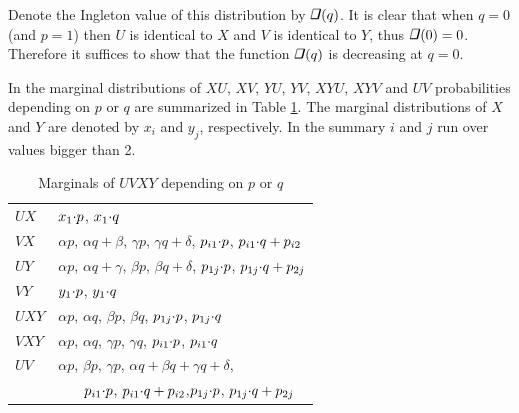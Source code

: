 \documentclass{IEEEtran}
\newcommand\ing{\begin{tikzpicture}[scale=0.13\ht\strutbox]%
        \draw[line width=0.015cm](0,0)--(0.055,0.22)--(0.22,0.22);
        \draw[line width=0.035cm](0.22,0.22)--(0.165,0);
        \draw[line width=0.025cm](0.165,0)--(0,0);
   \end{tikzpicture}}
\begin{document}
Denote the Ingleton value of this distribution by $\ing(q)$. It is clear
that when $q=0$ (and $p=1$) then $U$ is identical to $X$ and $V$ is
identical to $Y$, thus $\ing(0)=0$. Therefore it suffices to show that the
function $\ing(q)$ is decreasing at $q=0$.

In the marginal distributions of $XU$, $XV$, $YU$, $YV$, $XYU$, $XYV$ and
$UV$ probabilities depending on $p$ or $q$ are summarized in Table
\ref{table:list}. The marginal distributions of $X$ and $Y$ are denoted by
$x_i$ and $y_j$, respectively. In the summary $i$ and $j$ run over values
bigger than 2.

\begin{table}[htb]
\begin{center}\begin{tabular}{|l|l|}
\hline\rule{0pt}{11pt}%
$UX$ & $x_1{\cdot} p$, $x_1{\cdot} q$\\[1.5pt]
$VX$ & $\alpha p$, $\alpha q+\beta$, $\gamma p$, $\gamma q+\delta$,
       $p_{i1}{\cdot} p$, $p_{i1}{\cdot} q+p_{i2}$\\[1.5pt]
$UY$ & $\alpha p$, $\alpha q+\gamma$, $\beta p$, $\beta q+\delta$,
       $p_{1j}{\cdot} p$, $p_{1j}{\cdot} q+p_{2j}$\\[1.5pt]
$VY$ & $y_1{\cdot} p$, $y_1{\cdot} q$\\[3pt]
$UXY$ & $\alpha p$, $\alpha q$, $\beta p$, $\beta q$, $p_{1j}{\cdot} p$,
       $p_{1j}{\cdot} q$\\[1.5pt]
$VXY$ & $\alpha p$, $\alpha q$, $\gamma p$, $\gamma q$, $p_{i1}{\cdot} p$,
       $p_{i1}{\cdot} q$\\[1.5pt]
$UV$ & $\alpha p$, $\beta p$, $\gamma p$,
       $\alpha q+\beta q+\gamma q+\delta$, \\[1pt]
     & ~~~ $p_{i1}{\cdot} p$, $p_{i1}{\cdot} q+p_{i2}$,$p_{1j}{\cdot} p$, 
       $p_{1j}{\cdot} q+p_{2j}$\\[2pt]
\hline
\end{tabular}\end{center}
\caption{Marginals of $UVXY$ depending on $p$ or $q$}\label{table:list}
\end{table}
\end{document}
